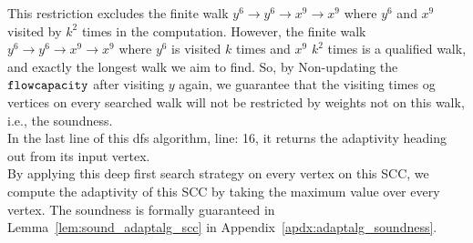 This restriction excludes the finite walk $y^6 \to y^6 \to x^9 \to x^9$ where $y^6$ and $x^9$ visited by $k^2$ times
in the computation. 
However, the finite walk $y^6 \to y^6 \to x^9 \to x^9$ where $y^6$ is visited $k$ times and $x^9$ $k^2$ times is 
a qualified walk, and exactly the longest walk we aim to find. So, by Non-updating the $\mathtt{flowcapacity}$ after 
visiting $y$ again, we guarantee that the visiting times og vertices on every searched walk will not be restricted by weights not on this walk,
i.e., the soundness.
\\
In the last line of this dfs algorithm, line: 16, it returns the adaptivity heading out from its input vertex.
\\
By applying this deep first search strategy on every vertex on this SCC, 
we compute the adaptivity of this SCC by taking the maximum 
value over every vertex.
%
The soundness is formally guaranteed in Lemma~\ref{lem:sound_adaptalg_scc} in Appendix~\ref{apdx:adaptalg_soundness}.


